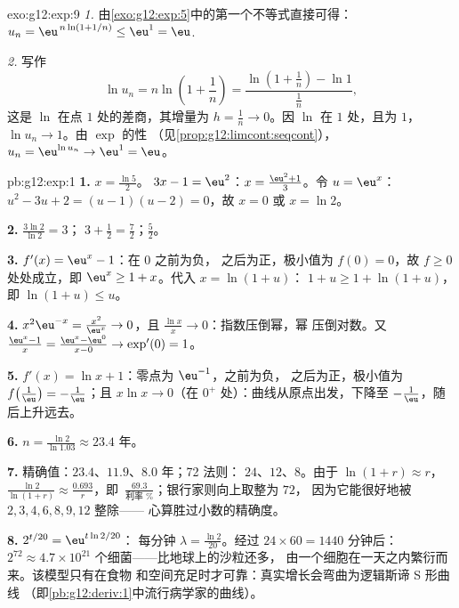 \begin{solution}{exo:g12:exp:9}
\emph{1.} 由\cref{exo:g12:exp:5}中的第一个不等式直接可得：
$u_n = \eu^{\,n\ln(1+1/n)} \leq \eu^1 = \eu$.

\emph{2.} 写作
\[
\ln u_n = n \ln\!\left(1 + \frac1n\right)
= \frac{\ln\!\left(1 + \frac1n\right) - \ln 1}{\frac1n},
\]
这是 $\ln$ 在点 $1$ 处的差商，其增量为
$h = \frac1n \to 0$。因 $\ln$ 在 $1$ 处，且为
$1$，$\ln u_n \to 1$。由 $\exp$ 的性
（见\cref{prop:g12:limcont:seqcont}），$u_n = \eu^{\ln u_n} \to \eu^1 = \eu$。
\end{solution}

\begin{solution}{pb:g12:exp:1}
\textbf{1.} $x = \frac{\ln 5}{2}$。\quad
$3x - 1 = \eu^2$：$x = \frac{\eu^2 + 1}{3}$。\quad 令
$u = \eu^x$：$u^2 - 3u + 2 = (u - 1)(u - 2) = 0$，故 $x = 0$ 或
$x = \ln 2$。

\textbf{2.} $\frac{3\ln 2}{\ln 2} = 3$；\quad
$3 + \frac12 = \frac72$；\quad $\frac52$。

\textbf{3.} $f'(x) = \eu^x - 1$：在 $0$ 之前为负，
之后为正，极小值为 $f(0) = 0$，故 $f \geq 0$ 处处成立，即
$\eu^x \geq 1 + x$。代入 $x = \ln(1 + u)$：
$1 + u \geq 1 + \ln(1 + u)$，即 $\ln(1 + u) \leq u$。

\textbf{4.} $x^2\eu^{-x} = \frac{x^2}{\eu^x} \to 0$，且
$\frac{\ln x}{x} \to 0$：指数压倒幂，幂
压倒对数。又 $\frac{\eu^x - 1}{x} =
\frac{\eu^x - \eu^0}{x - 0} \to \exp'(0) = 1$。

\textbf{5.} $f'(x) = \ln x + 1$：零点为 $\eu^{-1}$，之前为负，
之后为正，极小值为
$f\!\left(\frac1\eu\right) = -\frac1\eu$；且
$x \ln x \to 0$（在 $0^+$ 处）：曲线从原点出发，下降至
$-\frac1\eu$，随后上升远去。

\textbf{6.} $n = \frac{\ln 2}{\ln 1.03} \approx 23.4$ 年。

\textbf{7.} 精确值：$23.4$、$11.9$、$8.0$ 年；72 法则：
$24$、$12$、$8$。由于 $\ln(1+r) \approx r$，
$\frac{\ln 2}{\ln(1+r)} \approx \frac{0.693}{r}$，即\
$\frac{69.3}{\text{利率 }\%}$；银行家则向上取整为 $72$，
因为它能很好地被 $2, 3, 4, 6, 8, 9, 12$ 整除——
心算胜过小数的精确度。

\textbf{8.} $2^{t/20} = \eu^{t \ln 2 / 20}$：
每分钟 $\lambda = \frac{\ln 2}{20}$。经过
$24 \times 60 = 1440$ 分钟后：$2^{72} \approx 4.7 \times
10^{21}$ 个细菌——比地球上的沙粒还多，
由一个细胞在一天之内繁衍而来。该模型只有在食物
和空间充足时才可靠：真实增长会弯曲为逻辑斯谛 S 形曲线
（即\cref{pb:g12:deriv:1}中流行病学家的曲线）。


\end{solution}
